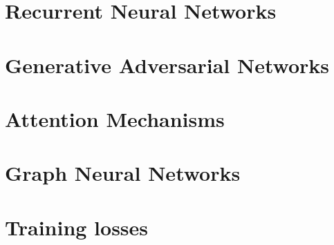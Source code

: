 \section{Recurrent Neural Networks}
\label{sec:3_rnns}

\section{Generative Adversarial Networks}
\label{sec:3_gans}

\section{Attention Mechanisms}
\label{sec:3_attention}

\section{Graph Neural Networks}
\label{sec:3_gnns}

\section{Training losses}
\label{sec:3_losses}